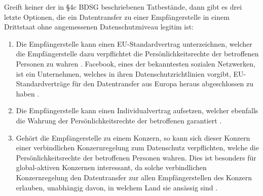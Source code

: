 \par
Greift keiner der in §4c BDSG beschriebenen Tatbestände, dann gibt es drei letzte Optionen, die ein Datentransfer zu einer Empfängerstelle in einem Drittstaat ohne angemessenen Datenschutzniveau legitim ist:
\begin{enumerate}
	\item Die Empfängerstelle kann einen EU-Standardvertrag unterzeichnen, welcher die Empfängerstelle dazu verpflichtet die Persönlichkeitsrechte der betroffenen Personen zu wahren \autocite[vgl.][]{LDI.2017}. Facebook, eines der bekanntesten sozialen Netzwerken, ist ein Unternehmen, welches in ihren Datenschutzrichtlinien vorgibt, EU-Standardverträge für den Datentransfer aus Europa heraus abgeschlossen zu haben \autocite[vgl.][]{FacebookInc..2017}.
	 
	\item Die Empfängerstelle kann einen Individualvertrag aufsetzen, welcher ebenfalls die Wahrung der Persönlichkeitsrechte der betroffenen garantiert \autocite[vgl.][]{LDI.2017}.
	
	\item Gehört die Empfängerstelle zu einem Konzern, so kann sich dieser Konzern einer verbindlichen Konzernregelung zum Datenschutz verpflichten, welche die Persönlichkeitsrechte der betroffenen Personen wahren. Dies ist besonders für global-aktiven Konzernen interessant, da solche verbindlichen Konzernregelung den Datentransfer zur allen Empfängerstellen des Konzern erlauben, unabhängig davon, in welchem Land sie ansässig sind \autocite[vgl.][]{LDI.2017}.
\end{enumerate}
